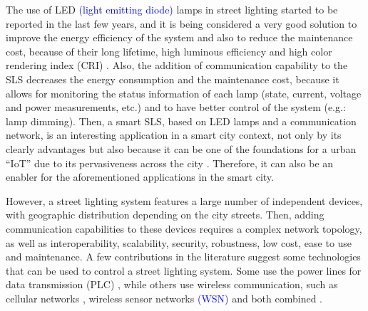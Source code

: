\documentclass[final,authoryear,3p,twocolumn]{elsarticle}
\newcommand{\rev}{\textcolor{blue}}
\begin{document}
The use of LED \rev{(light emitting diode)} lamps in street lighting started to be reported in the last few years, and it is being considered a very good solution to improve the energy efficiency of the system and also to reduce the maintenance cost, because of their long lifetime, high luminous efficiency and high color rendering index (CRI) \citep{CRI_2010}. Also, the addition of communication capability to the SLS decreases the energy consumption and the maintenance cost, because it allows for monitoring the status information of each lamp (state, current, voltage and power measurements, etc.) and to have better control of the system (e.g.: lamp dimming). Then, a smart SLS, based on LED lamps and a communication network, is an interesting application in a smart city context, not only by its clearly advantages but also because it can be one of the foundations for a urban ``IoT'' due to its pervasiveness across the city \citep{Smart_City_Smart_Light_2013}. Therefore, it can also be an enabler for the aforementioned applications in the smart city.

However, a street lighting system features a large number of independent devices, with geographic distribution depending on the city streets. Then, adding communication capabilities to these devices requires a complex network topology, as well as interoperability, scalability, security, robustness, low cost, ease to use and maintenance. A few contributions in the literature suggest some technologies that can be used to control a street lighting system. Some use the power lines for data transmission (PLC) \citep{PLC_Street_Lighting_2006}, while others use wireless communication, such as cellular networks \citep{Cellular_Street_Lighting_2010_1}, wireless sensor networks \rev{(WSN)} \citep{WSN_Street_Lighting_2010_1} and both combined \citep{WSN_Street_lighting_2007}.
\end{document}
